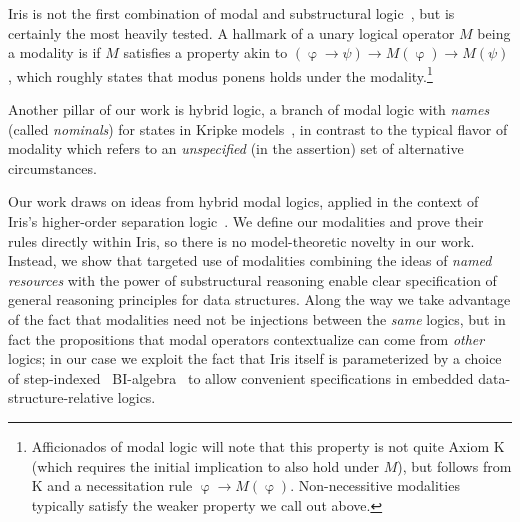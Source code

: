 Iris is not the first combination of modal and substructural logic~\cite{dovsen1992modal,restall1993modalities,d1997grafting,kamide2002kripke,licata2017fibrational}, but is certainly the most heavily tested.
A hallmark of a unary logical operator $M$ being a modality is if $M$ satisfies a property akin to $(\upvarphi\rightarrow\psi)\rightarrow M(\upvarphi)\rightarrow M(\psi)$, which roughly states that modus ponens holds under the modality.\footnote{Afficionados of modal logic will note that this property is not quite Axiom K (which requires the initial implication to also hold under $M$), but follows from K and a necessitation rule $\upvarphi\rightarrow M(\upvarphi)$. Non-necessitive modalities typically satisfy the weaker property we call out above.}

Another pillar of our work is hybrid logic, a branch of modal logic with \emph{names} (called \emph{nominals}) for states in Kripke models~\cite{blackburn1995hybrid,goranko1996hierarchies,areces2001hybrid,gargov1993modal}, in contrast to the typical flavor of modality which refers to an \emph{unspecified} (in the assertion) set of alternative circumstances. 

Our work draws on ideas from hybrid modal logics, applied in the context of Iris's higher-order separation logic~\cite{jung2018iris}. We define our modalities and prove their rules directly within Iris, so there is no model-theoretic novelty in our work. Instead, we show that targeted use of modalities combining the ideas of \emph{named resources} with the power of substructural reasoning enable clear specification of general reasoning principles for data structures. Along the way we take advantage of the fact that modalities need not be injections between the \emph{same} logics, but in fact the propositions that modal operators contextualize can come from \emph{other} logics; in our case we exploit the fact that Iris itself is parameterized by a choice of step-indexed~\cite{ahmed-appel-virga-02} \textsf{BI}-algebra~\cite{ohearn1999bunched} to allow convenient specifications in embedded data-structure-relative logics.
